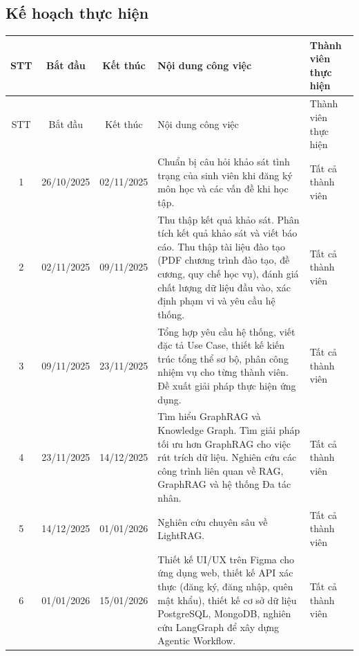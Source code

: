 \documentclass{article}[13pt]
\begin{document}
{    \subsection{Kế hoạch thực hiện}
    \begin{longtable}{|c|c|c|p{7cm}|p{3cm}|}
        \hline
        STT & Bắt đầu & Kết thúc & Nội dung công việc & Thành viên thực hiện \\
        \hline
        \endfirsthead

        \hline
        STT & Bắt đầu & Kết thúc & Nội dung công việc & Thành viên thực hiện \\
        \hline
        \endhead

        1 & 26/10/2025 & 02/11/2025 &
        Chuẩn bị câu hỏi khảo sát tình trạng của sinh viên khi đăng ký môn học và các vấn đề khi học tập.
        & Tất cả thành viên \\ \hline

        2 & 02/11/2025 & 09/11/2025 &
        Thu thập kết quả khảo sát. \newline
        Phân tích kết quả khảo sát và viết báo cáo. \newline
        Thu thập tài liệu đào tạo (PDF chương trình đào tạo, đề cương, quy chế học vụ), đánh giá chất lượng dữ liệu đầu vào, xác định phạm vi và yêu cầu hệ thống.
        & Tất cả thành viên \\ \hline

        3 & 09/11/2025 & 23/11/2025 &
        Tổng hợp yêu cầu hệ thống, viết đặc tả Use Case, thiết kế kiến trúc tổng thể sơ bộ, phân công nhiệm vụ cho từng thành viên. \newline
        Đề xuất giải pháp thực hiện ứng dụng.
        & Tất cả thành viên \\ \hline

        4 & 23/11/2025 & 14/12/2025 &
        Tìm hiểu GraphRAG và Knowledge Graph. \newline
        Tìm giải pháp tối ưu hơn GraphRAG cho việc rút trích dữ liệu. \newline
        Nghiên cứu các công trình liên quan về RAG, GraphRAG và hệ thống Đa tác nhân.
        & Tất cả thành viên \\ \hline

        5 & 14/12/2025 & 01/01/2026 &
        Nghiên cứu chuyên sâu về LightRAG.
        & Tất cả thành viên \\ \hline

        6 & 01/01/2026 & 15/01/2026 &
        Thiết kế UI/UX trên Figma cho ứng dụng web, thiết kế API xác thực (đăng ký, đăng nhập, quên mật khẩu), thiết kế cơ sở dữ liệu PostgreSQL, MongoDB, nghiên cứu LangGraph để xây dựng Agentic Workflow.
        & Tất cả thành viên \\ \hline


\end{longtable}}
\end{document}
